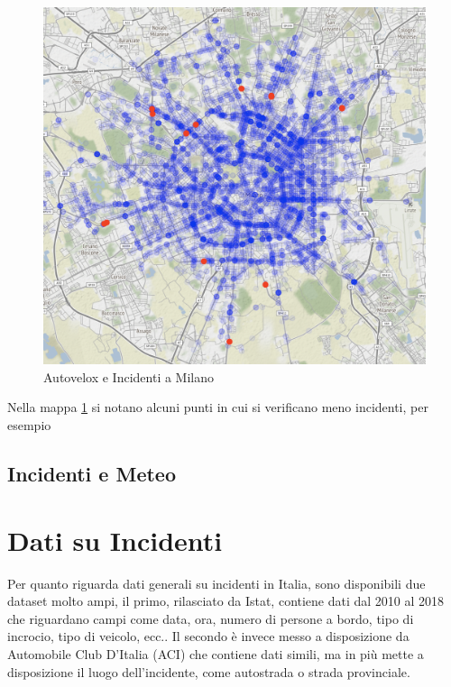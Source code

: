 \documentclass[a4paper]{report}
\begin{document}
\begin{figure}
    \includegraphics[width=\linewidth]{../src/autovelox/autovelox_incidenti_2014.png}
    \caption{Autovelox e Incidenti a Milano}
    \label{fig:autovelox-incidenti}
\end{figure}

Nella mappa \ref{fig:autovelox-incidenti} si notano alcuni punti in cui si verificano meno incidenti, 
per esempio 



\section{Incidenti e Meteo}

\chapter{Dati su Incidenti}

Per quanto riguarda dati generali su incidenti in Italia, sono disponibili due dataset molto ampi, 
il primo, rilasciato da Istat, contiene dati dal 2010 al 2018 che riguardano campi come data, ora, 
numero di persone a bordo, tipo di incrocio, tipo di veicolo, ecc..
Il secondo è invece messo a disposizione da Automobile Club D'Italia (ACI) che contiene dati simili, 
ma in più mette a disposizione il luogo dell'incidente, come autostrada o strada provinciale.
\end{document}
